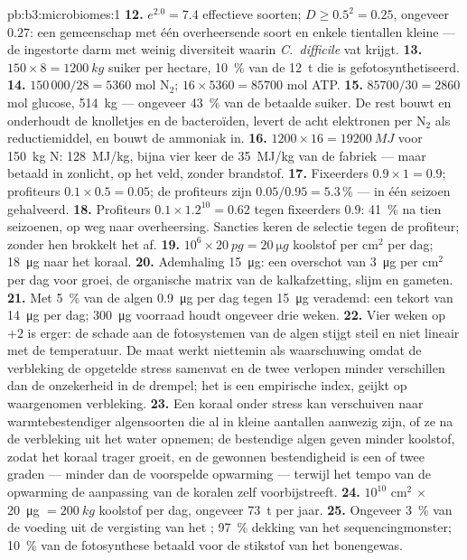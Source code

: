 \begin{solution}{pb:b3:microbiomes:1}
\textbf{12.} $e^{2.0} = 7.4$ effectieve soorten; $D \ge 0.5^{2} = 0.25$,
ongeveer $0.27$: een gemeenschap met één overheersende soort en enkele
tientallen kleine --- de ingestorte darm met weinig diversiteit waarin
\emph{C.~difficile} vat krijgt.
\textbf{13.} $150\times 8 = \qty{1200}{kg}$ suiker per hectare,
\qty{10}{\%} van de \qty{12}{t} die is gefotosynthetiseerd.
\textbf{14.} $150\,000/28 = 5360$ mol N$_{2}$; $16\times 5360 =
\num{85700}$ mol ATP.
\textbf{15.} $\num{85700}/30 = 2860$ mol glucose, \qty{514}{kg} ---
ongeveer \qty{43}{\%} van de betaalde suiker. De rest bouwt en
onderhoudt de knolletjes en de bacteroïden, levert de acht elektronen
per N$_{2}$ als reductiemiddel, en bouwt de ammoniak in.
\textbf{16.} $1200\times 16 = \qty{19200}{MJ}$ voor \qty{150}{kg} N:
\qty{128}{MJ/kg}, bijna vier keer de \qty{35}{MJ/kg} van de fabriek ---
maar betaald in zonlicht, op het veld, zonder brandstof.
\textbf{17.} Fixeerders $0.9\times 1 = 0.9$; profiteurs $0.1\times 0.5 =
0.05$; de profiteurs zijn $0.05/0.95 = 5.3\,\%$ --- in één seizoen
gehalveerd.
\textbf{18.} Profiteurs $0.1\times 1.2^{10} = 0.62$ tegen fixeerders
$0.9$: \qty{41}{\%} na tien seizoenen, op weg naar overheersing.
Sancties keren de selectie tegen de profiteur; zonder hen brokkelt het
 af.
\textbf{19.} $10^{6}\times \qty{20}{pg} = \qty{20}{\micro g}$ koolstof
per cm$^{2}$ per dag; \qty{18}{\micro g} naar het koraal.
\textbf{20.} Ademhaling \qty{15}{\micro g}: een overschot van
\qty{3}{\micro g} per cm$^{2}$ per dag voor groei, de organische matrix
van de kalkafzetting, slijm en gameten.
\textbf{21.} Met \qty{5}{\%} van de algen \qty{0.9}{\micro g} per dag
tegen \qty{15}{\micro g} verademd: een tekort van \qty{14}{\micro g} per
dag; \qty{300}{\micro g} voorraad houdt ongeveer drie weken.
\textbf{22.} Vier weken op $+2$ is erger: de schade aan de
fotosystemen van de algen stijgt steil en niet lineair met de
temperatuur. De maat werkt niettemin als waarschuwing omdat de
verbleking de opgetelde stress samenvat en de twee verlopen minder
verschillen dan de onzekerheid in de drempel; het is een empirische
index, geijkt op waargenomen verbleking.
\textbf{23.} Een koraal onder stress kan verschuiven naar
warmtebestendiger algensoorten die al in kleine aantallen aanwezig
zijn, of ze na de verbleking uit het water opnemen; de bestendige algen
geven minder koolstof, zodat het koraal trager groeit, en de gewonnen
bestendigheid is een of twee graden --- minder dan de voorspelde
opwarming --- terwijl het tempo van de opwarming de aanpassing van de
koralen zelf voorbijstreeft.
\textbf{24.} $10^{10}$ cm$^{2}$ $\times$ \qty{20}{\micro g} $=
\qty{200}{kg}$ koolstof per dag, ongeveer \qty{73}{t} per jaar.
\textbf{25.} Ongeveer \qty{3}{\%} van de voeding uit de vergisting van
het ; \qty{97}{\%} dekking van het sequencingmonster;
\qty{10}{\%} van de fotosynthese betaald voor de stikstof van het
bonengewas.
\end{solution}
